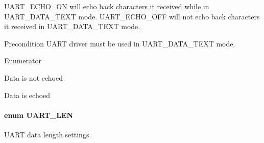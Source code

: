 U\+A\+R\+T\+\_\+\+E\+C\+H\+O\+\_\+\+O\+N will echo back characters it received while in U\+A\+R\+T\+\_\+\+D\+A\+T\+A\+\_\+\+T\+E\+X\+T mode. U\+A\+R\+T\+\_\+\+E\+C\+H\+O\+\_\+\+O\+F\+F will not echo back characters it received in U\+A\+R\+T\+\_\+\+D\+A\+T\+A\+\_\+\+T\+E\+X\+T mode.

\begin{DoxyPrecond}{Precondition}
U\+A\+R\+T driver must be used in U\+A\+R\+T\+\_\+\+D\+A\+T\+A\+\_\+\+T\+E\+X\+T mode. 
\end{DoxyPrecond}
\begin{Desc}
\item[Enumerator]\par
\begin{description}
\item[{\em 
U\+A\+R\+T\+\_\+\+E\+C\+H\+O\+\_\+\+O\+F\+F\label{_u_a_r_t_8h_aac6a03c2e1d76f53e1d9d923dcdc24f2a2b286f182793d4a71bdf99409b9600dd}
}]Data is not echoed \item[{\em 
U\+A\+R\+T\+\_\+\+E\+C\+H\+O\+\_\+\+O\+N\label{_u_a_r_t_8h_aac6a03c2e1d76f53e1d9d923dcdc24f2a6c4d8a2d4e30c22cf9fa45cd1bf79306}
}]Data is echoed \end{description}
\end{Desc}
\paragraph[{U\+A\+R\+T\+\_\+\+L\+E\+N}]{\setlength{\rightskip}{0pt plus 5cm}enum {\bf U\+A\+R\+T\+\_\+\+L\+E\+N}}\label{_u_a_r_t_8h_adf245d5f10db0abcbd8ad62a0d80c694}


U\+A\+R\+T data length settings. 

